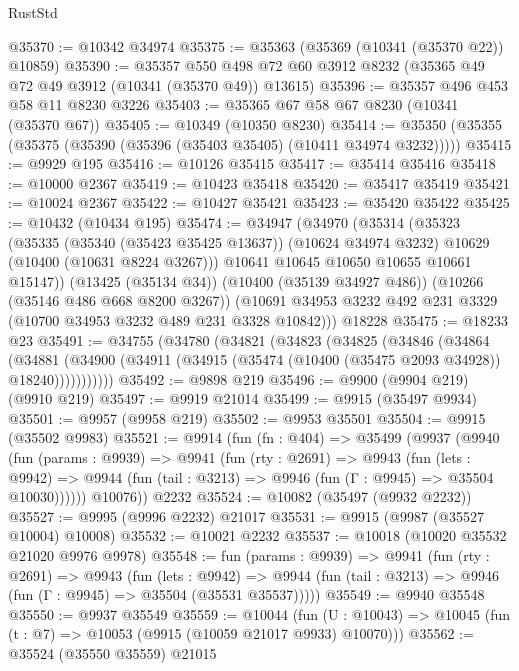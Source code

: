 \begin{lexlean}{RustStd}
\begin{coremodule}
@35370 := @10342 @34974
@35375 := @35363 (@35369 (@10341 (@35370 @22)) @10859)
@35390 := @35357
    @550
    @498
    @72
    @60
    @3912
    @8232
    (@35365 @49 @72 @49 @3912 (@10341 (@35370 @49)) @13615)
@35396 := @35357 @496 @453 @58 @11 @8230 @3226
@35403 := @35365 @67 @58 @67 @8230 (@10341 (@35370 @67))
@35405 := @10349 (@10350 @8230)
@35414 := @35350 (@35355 (@35375 (@35390 (@35396 (@35403 @35405) (@10411 @34974 @3232)))))
@35415 := @9929 @195
@35416 := @10126 @35415
@35417 := @35414 @35416
@35418 := @10000 @2367
@35419 := @10423 @35418
@35420 := @35417 @35419
@35421 := @10024 @2367
@35422 := @10427 @35421
@35423 := @35420 @35422
@35425 := @10432 (@10434 @195)
@35474 := @34947
    (@34970
      (@35314
        (@35323
          (@35335
            (@35340 (@35423 @35425 @13637))
            (@10624 @34974 @3232)
            @10629
            (@10400 (@10631 @8224 @3267)))
          @10641
          @10645
          @10650
          @10655
          @10661
          @15147))
      (@13425 (@35134 @34))
      (@10400 (@35139 @34927 @486))
      (@10266 (@35146 @486 @668 @8200 @3267))
      (@10691 @34953 @3232 @492 @231 @3329 (@10700 @34953 @3232 @489 @231 @3328 @10842)))
    @18228
@35475 := @18233 @23
@35491 := @34755
    (@34780
      (@34821
        (@34823
          (@34825
            (@34846
              (@34864
                (@34881
                  (@34900 (@34911 (@34915 (@35474 (@10400 (@35475 @2093 @34928)) @18240)))))))))))
@35492 := @9898 @219
@35496 := @9900 (@9904 @219) (@9910 @219)
@35497 := @9919 @21014
@35499 := @9915 (@35497 @9934)
@35501 := @9957 (@9958 @219)
@35502 := @9953 @35501
@35504 := @9915 (@35502 @9983)
@35521 := @9914
    (fun (fn : @404) =>
    @35499
      (@9937
        (@9940
          (fun (params : @9939) =>
          @9941
            (fun (rty : @2691) =>
            @9943
              (fun (lets : @9942) =>
              @9944 (fun (tail : @3213) => @9946 (fun (Γ : @9945) => @35504 @10030))))))
        @10076))
    @2232
@35524 := @10082 (@35497 (@9932 @2232))
@35527 := @9995 (@9996 @2232) @21017
@35531 := @9915 (@9987 (@35527 @10004) @10008)
@35532 := @10021 @2232
@35537 := @10018 (@10020 @35532 @21020 @9976 @9978)
@35548 := fun (params : @9939) =>
  @9941
    (fun (rty : @2691) =>
    @9943
      (fun (lets : @9942) =>
      @9944 (fun (tail : @3213) => @9946 (fun (Γ : @9945) => @35504 (@35531 @35537)))))
@35549 := @9940 @35548
@35550 := @9937 @35549
@35559 := @10044
    (fun (U : @10043) => @10045 (fun (t : @7) => @10053 (@9915 (@10059 @21017 @9933) @10070)))
@35562 := @35524 (@35550 @35559) @21015

\end{coremodule}
\end{lexlean}
